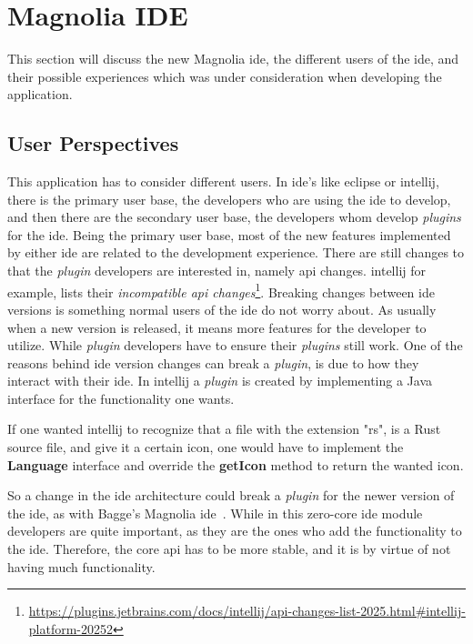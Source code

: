 \chapter{Magnolia IDE} \label{cha:ide}

This section will discuss the new Magnolia \gls*{ide}, the different users of the
\gls*{ide}, and their possible experiences which was under consideration when
developing the application.

\section{User Perspectives}

This application has to consider different users. In \gls*{ide}'s like
\gls*{eclipse} or \gls*{intellij}, there is the primary user base, the developers
who are using the \gls*{ide} to develop, and then there are the secondary user
base, the developers whom develop \textit{plugins} for the \gls*{ide}. Being the
primary user base, most of the new features implemented by either \gls*{ide} are
related to the development experience. There are still changes to that the
\textit{plugin} developers are interested in, namely \gls*{api} changes.
\gls*{intellij} for example, lists their \textit{incompatible \gls*{api} changes}\footnote{\url{https://plugins.jetbrains.com/docs/intellij/api-changes-list-2025.html\#intellij-platform-20252}}.
Breaking changes between \gls*{ide} versions is something normal users of the
\gls*{ide} do not worry about. As usually when a new version is released, it
means more features for the developer to utilize. While \textit{plugin}
developers have to ensure their \textit{plugins} still work. One of the reasons
behind \gls*{ide} version changes can break a \textit{plugin}, is due to how
they interact with their \gls*{ide}. In \gls*{intellij} a \textit{plugin} is
created by implementing a Java interface for the functionality one wants.

If one wanted \gls*{intellij} to recognize that a file with the extension "rs",
is a Rust source file, and give it a certain icon, one would have to implement
the \textbf{Language} interface and override the \textbf{getIcon} method to
return the wanted icon.

So a change in the \gls*{ide} architecture could break a \textit{plugin} for the
newer version of the \gls*{ide}, as with Bagge's Magnolia \gls*{ide}~\cite{baggeIde}.
While in this zero-core \gls*{ide} module developers are quite important, as they
are the ones who add the functionality to the \gls*{ide}. Therefore, the core
\gls*{api} has to be more stable, and it is by virtue of not having much
functionality.


